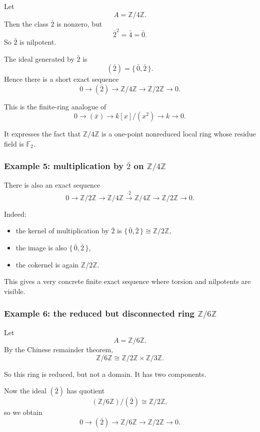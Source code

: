 \documentclass[12pt,a4paper]{article}
\theoremstyle{notespace}
\theoremstyle{definition}
\begin{document}
Let
\[
A=\mathbb Z/4\mathbb Z.
\]
Then the class \(\bar 2\) is nonzero, but
\[
\bar 2^2=\bar 4=\bar 0.
\]
So \(\bar 2\) is nilpotent.

The ideal generated by \(\bar 2\) is
\[
(\bar 2)=\{\,\bar 0,\bar 2\,\}.
\]
Hence there is a short exact sequence
\[
0 \longrightarrow (\bar 2) \longrightarrow \mathbb Z/4\mathbb Z \longrightarrow \mathbb Z/2\mathbb Z \longrightarrow 0.
\]

This is the finite-ring analogue of
\[
0 \longrightarrow (\bar x) \longrightarrow k[x]/(x^2) \longrightarrow k \longrightarrow 0.
\]

It expresses the fact that \(\mathbb Z/4\mathbb Z\) is a one-point nonreduced local ring whose residue field is \(\mathbb F_2\).

\subsubsection{Example 5: multiplication by \(\bar 2\) on \(\mathbb Z/4\mathbb Z\)}

There is also an exact sequence
\[
0 \longrightarrow \mathbb Z/2\mathbb Z
\longrightarrow
\mathbb Z/4\mathbb Z
\xrightarrow{\cdot \bar 2}
\mathbb Z/4\mathbb Z
\longrightarrow
\mathbb Z/2\mathbb Z
\longrightarrow 0.
\]

Indeed:

\begin{itemize}
	\item the kernel of multiplication by \(\bar 2\) is \(\{\,\bar 0,\bar 2\,\}\cong \mathbb Z/2\mathbb Z\),
	\item the image is also \(\{\,\bar 0,\bar 2\,\}\),
	\item the cokernel is again \(\mathbb Z/2\mathbb Z\).
\end{itemize}

This gives a very concrete finite exact sequence where torsion and nilpotents are visible.

\subsubsection{Example 6: the reduced but disconnected ring \(\mathbb Z/6\mathbb Z\)}

Let
\[
A=\mathbb Z/6\mathbb Z.
\]
By the Chinese remainder theorem,
\[
\mathbb Z/6\mathbb Z \cong \mathbb Z/2\mathbb Z \times \mathbb Z/3\mathbb Z.
\]

So this ring is reduced, but not a domain. It has two components.

Now the ideal \((\bar 2)\) has quotient
\[
(\mathbb Z/6\mathbb Z)/(\bar 2)\cong \mathbb Z/2\mathbb Z,
\]
so we obtain
\[
0 \longrightarrow (\bar 2) \longrightarrow \mathbb Z/6\mathbb Z \longrightarrow \mathbb Z/2\mathbb Z \longrightarrow 0.
\]
\end{document}
